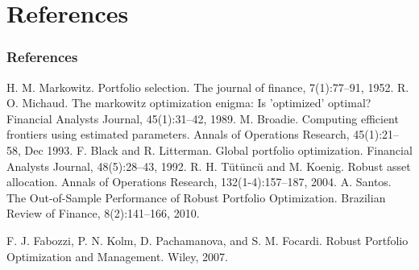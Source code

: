\documentclass{beamer}
\begin{document}










\section{References}

\begin{frame}
\frametitle{References}
\footnotesize{
\begin{thebibliography}{99} %
 H. M. Markowitz. Portfolio selection. The journal of finance, 7(1):77–91,
1952.
 R. O. Michaud. The markowitz optimization enigma: Is ’optimized’ optimal? Financial Analysts Journal, 45(1):31–42, 1989.
 M. Broadie. Computing efficient frontiers using estimated parameters. Annals of Operations Research, 45(1):21–58, Dec 1993.
 F. Black and R. Litterman. Global portfolio optimization. Financial Analysts Journal, 48(5):28–43, 1992.
 R. H. T{\"u}t{\"u}nc{\"u} and M. Koenig. Robust asset allocation. Annals of Operations Research, 132(1-4):157–187, 2004.
 A. Santos. The Out-of-Sample Performance of Robust Portfolio Optimization. Brazilian Review of Finance, 8(2):141--166, 2010.

 F. J. Fabozzi, P. N. Kolm, D. Pachamanova, and S. M. Focardi. Robust Portfolio Optimization and Management. Wiley, 2007.
\end{thebibliography}
}
\end{frame}
\end{document}
